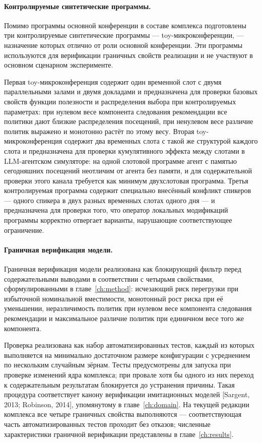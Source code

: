 \paragraph{Контролируемые синтетические программы.}
Помимо программы основной конференции в составе комплекса подготовлены три контролируемые синтетические программы --- toy-микроконференции, --- назначение которых отлично от роли основной конференции. Эти программы используются для верификации граничных свойств реализации и не участвуют в основном сценарном эксперименте.

Первая toy-микроконференция содержит один временной слот с двумя параллельными залами и двумя докладами и предназначена для проверки базовых свойств функции полезности и распределения выбора при контролируемых параметрах: при нулевом весе компонента следования рекомендации все политики дают близкие распределения посещений, при ненулевом весе различие политик выражено и монотонно растёт по этому весу. Вторая toy-микроконференция содержит два временных слота с такой же структурой каждого слота и предназначена для проверки кумулятивного эффекта между слотами в LLM-агентском симуляторе: на одной слотовой программе агент с памятью сегодняшних посещений неотличим от агента без памяти, и для содержательной проверки этого канала требуется как минимум двухслотовая программа. Третья контролируемая программа содержит специально внесённый конфликт спикеров --- одного спикера в двух разных временных слотах одного дня --- и предназначена для проверки того, что оператор локальных модификаций программы корректно отвергает варианты, нарушающие соответствующее ограничение.

\paragraph{Граничная верификация модели.}
Граничная верификация модели реализована как блокирующий фильтр перед содержательными выводами в соответствии с четырьмя свойствами, сформулированными в главе~\ref{ch:method}: исчезающий риск перегрузки при избыточной номинальной вместимости, монотонный рост риска при её уменьшении, неразличимость политик при нулевом весе компонента следования рекомендации и максимальное различие политик при единичном весе того же компонента.

Проверка реализована как набор автоматизированных тестов, каждый из которых выполняется на минимально достаточном размере конфигурации с усреднением по нескольким случайным зёрнам. Тесты предусмотрены для запуска при проверке изменений ядра комплекса; при провале хотя бы одного из них переход к содержательным результатам блокируется до устранения причины. Такая процедура соответствует канону верификации имитационных моделей [Sargent, 2013; Robinson, 2014], упомянутому в главе~\ref{ch:domain}. На текущей редакции комплекса все четыре граничных свойства выполняются --- соответствующая часть автоматизированных тестов проходит без отказов; численные характеристики граничной верификации представлены в главе~\ref{ch:results}.

